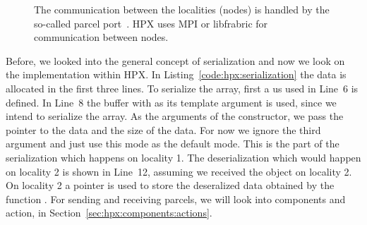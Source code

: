 \begin{figure}[tb]
\begin{center}
\end{center}
\caption{The communication between the localities (nodes) is handled by the so-called parcel port~\cite{kaiser2009parallex}. HPX uses MPI or libfrabric for communication between nodes.}
\label{fig:sending:network} 
\end{figure}

Before, we looked into the general concept of serialization and now we look on the implementation within HPX. In Listing~\ref{code:hpx:serialization} the data is allocated in the first three lines. To serialize the  array, first a  us used in Line~6 is defined. In Line~8 the buffer  with  as its template argument is used, since we intend to serialize the  array. As the arguments of the constructor, we pass the pointer to the data and the size of the data. For now we ignore the third argument and just use this mode as the default mode. This is the part of the serialization which happens on locality 1. The deserialization which would happen on locality 2 is shown in Line~12, assuming we received the  object on locality 2. On locality 2 a pointer  is used to store the deseralized data obtained by the function . For sending and receiving parcels, we will look into components and action, in Section~\ref{sec:hpx:components:actions}.


